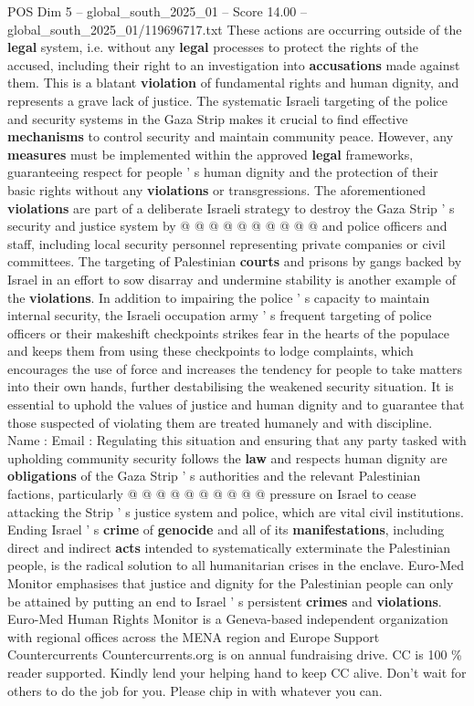 \begin{textsample}{POS Dim 5 – global\_south\_2025\_01 – Score 14.00 – global\_south\_2025\_01/119696717.txt}
These actions are occurring outside of the \textbf{legal} system, i.e. without any \textbf{legal} processes to protect the rights of the accused, including their right to an investigation into \textbf{accusations} made against them.
This is a blatant \textbf{violation} of fundamental rights and human dignity, and represents a grave lack of justice.
The systematic Israeli targeting of the police and security systems in the Gaza Strip makes it crucial to find effective \textbf{mechanisms} to control security and maintain community peace.
However, any \textbf{measures} must be implemented within the approved \textbf{legal} frameworks, guaranteeing respect for people ' s human dignity and the protection of their basic rights without any \textbf{violations} or transgressions.
The aforementioned \textbf{violations} are part of a deliberate Israeli strategy to destroy the Gaza Strip ' s security and justice system by @ @ @ @ @ @ @ @ @ @ and police officers and staff, including local security personnel representing private companies or civil committees.
The targeting of Palestinian \textbf{courts} and prisons by gangs backed by Israel in an effort to sow disarray and undermine stability is another example of the \textbf{violations}.
In addition to impairing the police ' s capacity to maintain internal security, the Israeli occupation army ' s frequent targeting of police officers or their makeshift checkpoints strikes fear in the hearts of the populace and keeps them from using these checkpoints to lodge complaints, which encourages the use of force and increases the tendency for people to take matters into their own hands, further destabilising the weakened security situation.
It is essential to uphold the values of justice and human dignity and to guarantee that those suspected of violating them are treated humanely and with discipline.
Name : Email : Regulating this situation and ensuring that any party tasked with upholding community security follows the \textbf{law} and respects human dignity are \textbf{obligations} of the Gaza Strip ' s authorities and the relevant Palestinian factions, particularly @ @ @ @ @ @ @ @ @ @ pressure on Israel to cease attacking the Strip ' s justice system and police, which are vital civil institutions.
Ending Israel ' s \textbf{crime} of \textbf{genocide} and all of its \textbf{manifestations}, including direct and indirect \textbf{acts} intended to systematically exterminate the Palestinian people, is the radical solution to all humanitarian crises in the enclave.
Euro-Med Monitor emphasises that justice and dignity for the Palestinian people can only be attained by putting an end to Israel ' s persistent \textbf{crimes} and \textbf{violations}.
Euro-Med Human Rights Monitor is a Geneva-based independent organization with regional offices across the MENA region and Europe Support Countercurrents Countercurrents.org is on annual fundraising drive.
CC is 100 \% reader supported.
Kindly lend your helping hand to keep CC alive.
Don't wait for others to do the job for you.
Please chip in with whatever you can.


\end{textsample}

